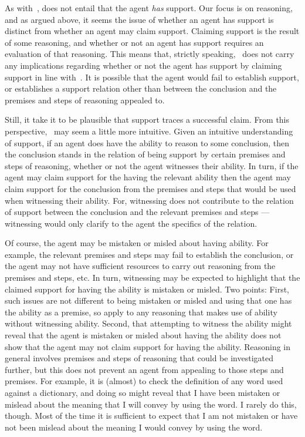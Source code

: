 \begin{note}
  As with~\ESU{}, \EAS{} does not entail that the agent \emph{has} support.
  Our focus is on reasoning, and as argued above, it seems the issue of whether an agent has support is distinct from whether an agent may claim support.
  Claiming support is the result of some reasoning, and whether or not an agent has support requires an evaluation of that reasoning.
  This means that, strictly speaking,~\EAS{} does not carry any implications regarding whether or not the agent has support by claiming support in line with~\EAS{}.
  It is possible that the agent would fail to establish support, or establishes a support relation other than between the conclusion and the premises and steps of reasoning appealed to.

  Still, it take it to be plausible that support traces a successful claim.
  From this perspective,~\EAS{} may seem a little more intuitive.
  Given an intuitive understanding of support, if an agent does have the ability to reason to some conclusion, then the conclusion stands in the relation of being support by certain premises and steps of reasoning, whether or not the agent witnesses their ability.
  In turn, if the agent may claim support for the having the relevant ability then the agent may claim support for the conclusion from the premises and steps that would be used when witnessing their ability.
  For, witnessing does not contribute to the relation of support between the conclusion and the relevant premises and steps --- witnessing would only clarify to the agent the specifics of the relation.

  Of course, the agent may be mistaken or misled about having ability.
  For example, the relevant premises and steps may fail to establish the conclusion, or the agent may not have sufficient resources to carry out reasoning from the premises and steps, etc.
  In turn, witnessing may be expected to highlight that the claimed support for having the ability is mistaken or misled.
  Two points:
  First, such issues are not different to being mistaken or misled and using that one has the ability as a premise, so apply to any reasoning that makes use of ability without witnessing ability.
  Second, that attempting to witness the ability might reveal that the agent is mistaken or misled about having the ability does not show that the agent may not claim support for having the ability.
  Reasoning in general involves premises and steps of reasoning that could be investigated further, but this does not prevent an agent from appealing to those steps and premises.
  For example, it is (almost) to check the definition of any word used against a dictionary, and doing so might reveal that I have been mistaken or mislead about the meaning that I will convey by using the word.
  I rarely do this, though.
  Most of the time it is sufficient to expect that I am not mistaken or have not been mislead about the meaning I would convey by using the word.
\end{note}

